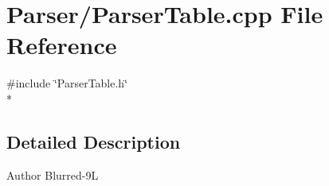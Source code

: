 \section{Parser/\-Parser\-Table.cpp File Reference}
\label{_parser_table_8cpp}
{\ttfamily \#include \char`\"{}Parser\-Table.\-h\char`\"{}}\\*


\subsection{Detailed Description}
\begin{DoxyAuthor}{Author}
Blurred-\/9\-L 
\end{DoxyAuthor}
